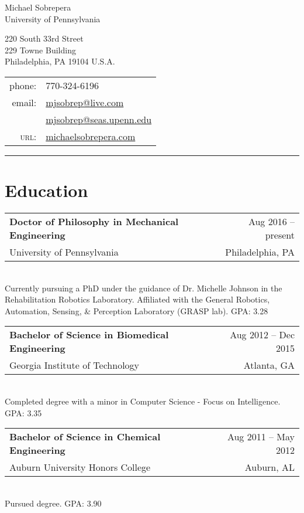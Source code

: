 \documentclass[10pt, letter]{article}
\makeatletter
\newlength{\currentparskip}
\newlength{\cvindent}
\newenvironment{cvsection}[1]{
    \section*{#1}   
}{
}
\newcommand{\cvitem}[6]{
    \setlength{\currentparskip}{\parskip}%
    \strut\hfill\begin{minipage}{\dimexpr\textwidth-\cvindent}
    \setlength{\parskip}{\currentparskip}%
    \begin{tabular*}{\linewidth}{@{}l@{\extracolsep{\fill}}r@{}}
        \textbf{#1} & #4 -- #5\\
        #2 & #3
    \end{tabular*}\\[.05cm]
    #6
    \end{minipage}
    \vspace{.3cm}
}
\makeatother
\begin{document}
\begin{center}
{\LARGE Michael Sobrepera}\\[.5cm]
University of Pennsylvania\\
\begin{minipage}[c]{.35\textwidth}
220 South 33rd Street\\
229 Towne Building\\
Philadelphia, PA 19104 U.S.A.\\[.2cm]
\end{minipage}
\begin{minipage}[c]{.35\textwidth}
\begin{tabular}{r l}
phone: & 770-324-6196\\
email: & \href{mailto:mjsobrep@live.com}{mjsobrep@live.com}\\
       & \href{mailto:mjsobrep@seas.upenn.edu}{mjsobrep@seas.upenn.edu}\\
\textsc{url}: & \href{http://michaelsobrepera.com}{michaelsobrepera.com}\\ 
\end{tabular}
\end{minipage}
\end{center}
\hrule
\vspace{.4cm}

\begin{cvsection}{Education}
    \cvitem{Doctor of Philosophy in Mechanical Engineering}{University of Pennsylvania}{Philadelphia, PA}{Aug 2016}{present}{Currently pursuing a PhD under the guidance of Dr. Michelle Johnson in the Rehabilitation Robotics Laboratory. Affiliated with the General Robotics, Automation, Sensing, \& Perception Laboratory (GRASP lab). GPA: 3.28}

    \cvitem{Bachelor of Science in Biomedical Engineering}{Georgia Institute of Technology}{Atlanta, GA}{Aug 2012}{Dec 2015}{Completed degree with a minor in Computer Science - Focus on Intelligence. GPA: 3.35}

    \cvitem{Bachelor of Science in Chemical Engineering}{Auburn University Honors College}{Auburn, AL}{Aug 2011}{May 2012}{Pursued degree. GPA: 3.90}
\end{cvsection}
\end{document}
